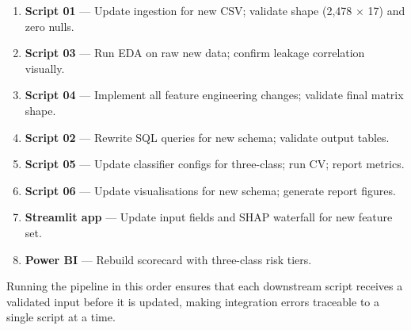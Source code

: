 \documentclass[11pt,a4paper]{article}
\begin{document}
\begin{enumerate}
  \item \textbf{Script 01} --- Update ingestion for new CSV; validate shape (2,478 $\times$ 17) and zero nulls.
  \item \textbf{Script 03} --- Run EDA on raw new data; confirm leakage correlation visually.
  \item \textbf{Script 04} --- Implement all feature engineering changes; validate final matrix shape.
  \item \textbf{Script 02} --- Rewrite SQL queries for new schema; validate output tables.
  \item \textbf{Script 05} --- Update classifier configs for three-class; run CV; report metrics.
  \item \textbf{Script 06} --- Update visualisations for new schema; generate report figures.
  \item \textbf{Streamlit app} --- Update input fields and SHAP waterfall for new feature set.
  \item \textbf{Power BI} --- Rebuild scorecard with three-class risk tiers.
\end{enumerate}

Running the pipeline in this order ensures that each downstream script receives a
validated input before it is updated, making integration errors traceable to a single
script at a time.
\end{document}
